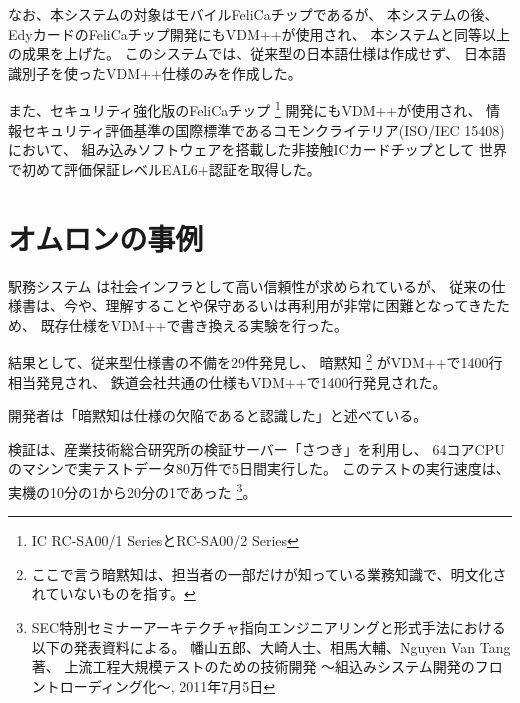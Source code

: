 なお、本システムの対象はモバイルFeliCaチップであるが、
	\label{FeliCaちっぷ@FeliCaチップ}
本システムの後、EdyカードのFeliCaチップ開発にもVDM++が使用され、
	\label{Edyかーど@Edyカード}
本システムと同等以上の成果を上げた。
このシステムでは、従来型の日本語仕様は作成せず、
日本語識別子を使ったVDM++仕様のみを作成した。

また、セキュリティ強化版のFeliCaチップ
	\footnote{IC RC-SA00/1 SeriesとRC-SA00/2 Series}
	\label{FeliCaちっぷ@FeliCaチップ}
開発にもVDM++が使用され、
情報セキュリティ評価基準の国際標準であるコモンクライテリア(ISO/IEC 15408)において、
組み込みソフトウェアを搭載した非接触ICカードチップとして
世界で初めて評価保証レベルEAL6+認証を取得した。


\section{オムロンの事例}
	\label{OMRON}

駅務システム
は社会インフラとして高い信頼性が求められているが、
従来の仕様書は、今や、理解することや保守あるいは再利用が非常に困難となってきたため、
既存仕様をVDM++で書き換える実験を行った。

結果として、従来型仕様書の不備を29件発見し、
暗黙知
\footnote{ここで言う暗黙知は、担当者の一部だけが知っている業務知識で、明文化されていないものを指す。}
がVDM++で1400行相当発見され、
鉄道会社共通の仕様もVDM++で1400行発見された。

開発者は「暗黙知は仕様の欠陥であると認識した」と述べている。

検証は、産業技術総合研究所の検証サーバー「さつき」を利用し、
64コアCPUのマシンで実テストデータ80万件で5日間実行した。
このテストの実行速度は、実機の10分の1から20分の1であった
\footnote{SEC特別セミナーアーキテクチャ指向エンジニアリングと形式手法における以下の発表資料による。
幡山五郎、大崎人士、相馬大輔、Nguyen Van Tang 著、
上流工程大規模テストのための技術開発
～組込みシステム開発のフロントローディング化～,
2011年7月5日
}。




